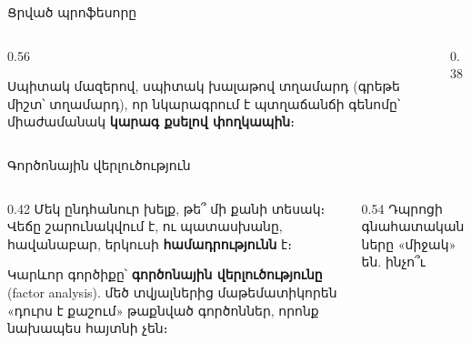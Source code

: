 
\begin{frame}{Ցրված պրոֆեսորը}
  \begin{columns}[T]
    \begin{column}{0.56\textwidth}
      \begin{bookquote}
        Սպիտակ մազերով, սպիտակ խալաթով տղամարդ (գրեթե միշտ՝ տղամարդ), որ նկարագրում է պտղաճանճի գենոմը՝ միաժամանակ \textbf{կարագ քսելով փողկապին}։
      \end{bookquote}
    \end{column}
    \begin{column}{0.38\textwidth}
      \centering
      \ \ \par\medskip
    \end{column}
  \end{columns}
\end{frame}

\begin{frame}{Գործոնային վերլուծություն}
  \begin{columns}[c]
    \begin{column}{0.42\textwidth}
      Մեկ ընդհանուր խելք, թե՞ մի քանի տեսակ։ Վեճը շարունակվում է, ու պատասխանը, հավանաբար, երկուսի \textbf{համադրությունն} է։\par\medskip
      Կարևոր գործիքը՝ \textbf{գործոնային վերլուծությունը} (factor analysis). մեծ տվյալներից մաթեմատիկորեն «դուրս է քաշում» թաքնված գործոններ, որոնք նախապես հայտնի չեն։
    \end{column}
    \begin{column}{0.54\textwidth}
      \centering
      {\blackfont\small Դպրոցի գնահատականները «միջակ» են. ինչո՞ւ}\par\smallskip
    \end{column}
  \end{columns}
\end{frame}

